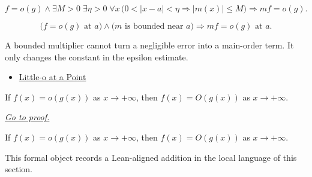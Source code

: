 \begin{remark*}
\[
f=o(g)\land \exists M>0\;\exists\eta>0\;\forall x\,
\bigl(0<|x-a|<\eta\Rightarrow |m(x)|\leq M\bigr)
\Longrightarrow mf=o(g).
\]
\end{remark*}

\begin{remark*}
\[
\bigl(f=o(g)\text{ at }a\bigr)\land
\bigl(m\text{ is bounded near }a\bigr)
\Longrightarrow
mf=o(g)\text{ at }a.
\]
\end{remark*}

\begin{remark*}[Interpretation]
A bounded multiplier cannot turn a negligible error into a main-order term. It
only changes the constant in the epsilon estimate.
\end{remark*}

\begin{dependencies}
\begin{itemize}
  \item \hyperref[def:little-o-at-a-point]{Little-o at a Point}
\end{itemize}
\end{dependencies}

\begin{theorem}
\label{thm:little-o-implies-big-o-at-top}
If $f(x)=o(g(x))$ as $x\to+\infty$, then $f(x)=O(g(x))$ as $x\to+\infty$.

\smallskip
\noindent
\hyperref[prf:little-o-implies-big-o-at-top]{\textit{Go to proof.}}
\end{theorem}

\begin{remark*}
If $f(x)=o(g(x))$ as $x\to+\infty$, then $f(x)=O(g(x))$ as $x\to+\infty$.
\end{remark*}

\begin{remark*}[Interpretation]
This formal object records a Lean-aligned addition in the local language of this section.
\end{remark*}

\begin{dependencies}
\NoLocalDependencies
\end{dependencies}
